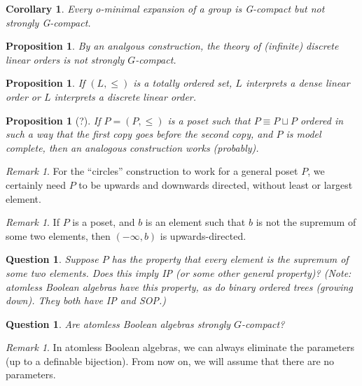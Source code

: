\documentclass[final,a4paper,12pt]{amsart}
\newtheorem{cor}[thm]{Corollary}
\newtheorem{prop}[thm]{Proposition}
\newtheorem{qu}[thm]{Question}
\theoremstyle{remark}
\newtheorem{rem}[thm]{Remark}
\theoremstyle{definition}
\begin{document}
	\begin{cor}
		Every o-minimal expansion of a group is G-compact but not strongly G-compact.
	\end{cor}
	
	\begin{prop}
		By an analgous construction, the theory of (infinite) discrete linear orders is not strongly $G$-compact.
	\end{prop}
	
	\begin{prop}
		If $(L,\leq)$ is a totally ordered set, $L$ interprets a dense linear order or $L$ interprets a discrete linear order.
	\end{prop}
	
	\begin{prop}[?]
		If $P=(P,\leq)$ is a poset such that $P\equiv P\sqcup P$ ordered in such a way that the first copy goes before the second copy, and $P$ is model complete, then an analogous construction works (probably).
	\end{prop}
	
	\begin{rem}
		For the ``circles'' construction to work for a general poset $P$, we certainly need $P$ to be upwards and downwards directed, without least or largest element.
	\end{rem}
	
	\begin{rem}
		If $P$ is a poset, and $b$ is an element such that $b$ is not the supremum of some two elements, then $(-\infty,b)$ is upwards-directed.
	\end{rem}
	
	\begin{qu}
		Suppose $P$ has the property that every element is the supremum of some two elements. Does this imply IP (or some other general property)? (Note: atomless Boolean algebras have this property, as do binary ordered trees (growing down). They both have IP and SOP.)
	\end{qu}
	
	\begin{qu}
		Are atomless Boolean algebras strongly $G$-compact?
	\end{qu}
	
	\begin{rem}
		In atomless Boolean algebras, we can always eliminate the parameters (up to a definable bijection). From now on, we will assume that there are no parameters.
	\end{rem}
	
\end{document}
